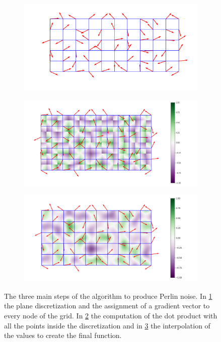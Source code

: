 \begin{figure}
    \centering
    \begin{subfigure}[b]{0.4\textwidth}
         \centering
         \includegraphics[width = \textwidth]{images/grid_grad}
         \caption{}
         \label{fig:grid_grad}
    \end{subfigure}
    \hfill
    \begin{subfigure}[b]{0.4\textwidth}
         \centering
         \includegraphics[width = \textwidth]{images/PerlinNoiseDotProducts}
         \caption{}
         \label{fig:dot_prod}
    \end{subfigure}
    \hfill
    \begin{subfigure}[b]{0.4\textwidth}
         \centering
         \includegraphics[width = \textwidth]{images/PerlinNoiseInterpolated}
         \caption{}
         \label{fig:interp}
    \end{subfigure}
    \caption{The three main steps of the algorithm to produce Perlin noise. In \ref{fig:grid_grad} the plane discretization and the assignment of a gradient vector to every node of the grid. In \ref{fig:dot_prod} the computation of the dot product with all the points inside the discretization and in \ref{fig:interp} the interpolation of the values to create the final function.}
    \label{fig:perlin_alg}
\end{figure}

